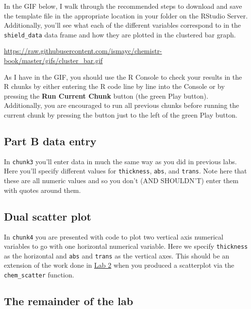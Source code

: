 \documentclass[]{tufte-book}
\begin{document}
In the GIF below, I walk through the recommended steps to download and
save the template file in the appropriate location in your folder on the
RStudio Server. Additionally, you'll see what each of the different
variables correspond to in the \texttt{shield\_data} data frame and how
they are plotted in the clustered bar graph.

\vspace{0.1in}

\begin{center}\footnotesize{\url{https://raw.githubusercontent.com/ismayc/chemistr-book/master/gifs/cluster_bar.gif}}\end{center}

\vspace{0.1in}

As I have in the GIF, you should use the R Console to check your results
in the R chunks by either entering the R code line by line into the
Console or by pressing the \textbf{Run Current Chunk} button (the green
Play button). Additionally, you are encouraged to run all previous
chunks before running the current chunk by pressing the button just to
the left of the green Play button.

\subsection{Part B data entry}\label{part-b-data-entry}

In \texttt{chunk3} you'll enter data in much the same way as you did in
previous labs. Here you'll specify different values for
\texttt{thickness}, \texttt{abs}, and \texttt{trans}. Note here that
these are all numeric values and so you don't (AND SHOULDN'T) enter them
with quotes around them.

\subsection{Dual scatter plot}\label{dual-scatter-plot}

In \texttt{chunk4} you are presented with code to plot two vertical axis
numerical variables to go with one horizontal numerical variable. Here
we specify \texttt{thickness} as the horizontal and \texttt{abs} and
\texttt{trans} as the vertical axes. This should be an extension of the
work done in \protect\hyperlink{beers}{Lab 2} when you produced a
scatterplot via the \texttt{chem\_scatter} function.

\subsection{The remainder of the lab}\label{the-remainder-of-the-lab-2}
\end{document}
